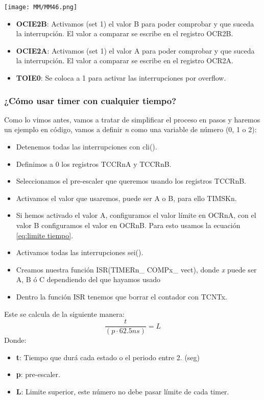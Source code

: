 \documentclass[
	12pt, %
	fleqn, %
	a4paper, %
	oneside, %
]{LegrandOrangeBook}
\begin{document}
\begin{center}
\texttt{[image: MM/MM46.png]}
\end{center}
\begin{itemize}
\item \textbf{OCIE2B}: Activamos (set 1) el valor B para poder comprobar y que suceda la interrupción. El valor a comparar se escribe en el registro OCR2B.
\item \textbf{OCIE2A}: Activamos (set 1) el valor A para poder comprobar y que suceda la interrupción. El valor a comparar se escribe en el registro OCR2A.
\item \textbf{TOIE0}: Se coloca a 1 para activar las interrupciones por overflow.
\end{itemize}
\subsubsection*{¿Cómo usar timer con cualquier tiempo?}
Como lo vimos antes, vamos a tratar de simplificar el proceso en pasos y haremos un ejemplo en código, vamos a definir \textit{n} como una variable de número (0, 1 o 2):
\begin{itemize}
\item Detenemos todas las interrupciones con cli().
\item Definimos a 0 los registros TCCRnA y TCCRnB.
\item Seleccionamos el pre-escaler que queremos usando los registros TCCRnB.
\item Activamos el valor que usaremos, puede ser A o B, para ello TIMSKn.
\item Si hemos activado el valor A, configuramos el valor límite en OCRnA, con el valor B configuramos el valor en OCRnB. Para esto usamos la ecuación \ref{eq:limite tiempo}.
\item Activamos todas las interrupciones sei().
\item Creamos nuestra función ISR(TIMERn\_ COMPx\_ vect), donde \textit{x} puede ser A, B ó C dependiendo del que hayamos usado
\item Dentro la función ISR tenemos que borrar el contador con TCNTx.
\end{itemize}
\begin{proposition}
Este se calcula de la siguiente manera:
\begin{equation}
\frac{t}{(p\cdot 62.5ns)}=L
\label{eq:limite tiempo}
\end{equation}
Donde:
\begin{itemize}
\item \textbf{t}: Tiempo que durá cada estado o el periodo entre 2. (seg)
\item \textbf{p}: pre-escaler.
\item \textbf{L}: Limite superior, este número no debe pasar límite de cada timer.
\end{itemize}
\end{proposition}
\end{document}
